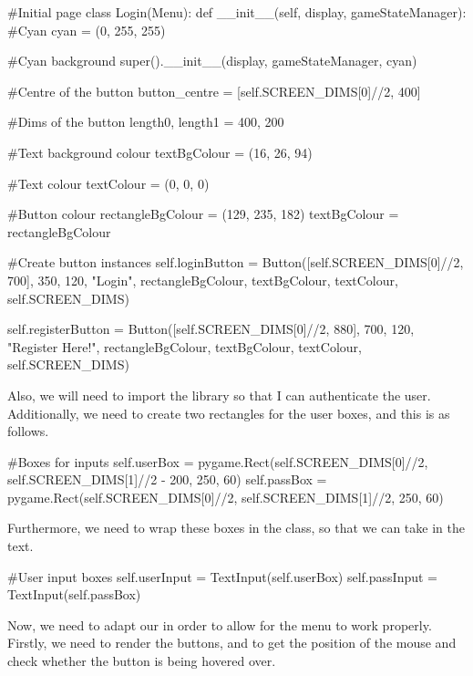 \begin{mpy}
#Initial page
class Login(Menu):
    def __init__(self, display, gameStateManager):
        #Cyan
        cyan = (0, 255, 255)

        #Cyan background
        super().__init__(display, gameStateManager, cyan)

        #Centre of the button
        button_centre = [self.SCREEN_DIMS[0]//2, 400]

        #Dims of the button
        length0, length1 = 400, 200

        #Text background colour
        textBgColour = (16, 26, 94)

        #Text colour
        textColour = (0, 0, 0)

        #Button colour
        rectangleBgColour = (129, 235, 182)
        textBgColour = rectangleBgColour

        #Create button instances
        self.loginButton = Button([self.SCREEN_DIMS[0]//2, 700], 350, 120, "Login", rectangleBgColour, textBgColour, textColour, self.SCREEN_DIMS)

        self.registerButton = Button([self.SCREEN_DIMS[0]//2, 880], 700, 120, "Register Here!", rectangleBgColour, textBgColour, textColour, self.SCREEN_DIMS)
\end{mpy}

Also, we will need to import the  library so that I can authenticate the user. Additionally, we need to create two rectangles for the user boxes, and this is as follows.

\begin{mpy}
        #Boxes for inputs
        self.userBox = pygame.Rect(self.SCREEN_DIMS[0]//2, self.SCREEN_DIMS[1]//2 - 200, 250, 60)
        self.passBox = pygame.Rect(self.SCREEN_DIMS[0]//2, self.SCREEN_DIMS[1]//2, 250, 60)
\end{mpy}

Furthermore, we need to wrap these boxes in the  class, so that we can take in the text.

\begin{mpy}
        #User input boxes
        self.userInput = TextInput(self.userBox)
        self.passInput = TextInput(self.passBox)
\end{mpy}

Now, we need to adapt our  in order to allow for the menu to work properly. Firstly, we need to render the buttons, and to get the position of the mouse and check whether the button is being hovered over.

